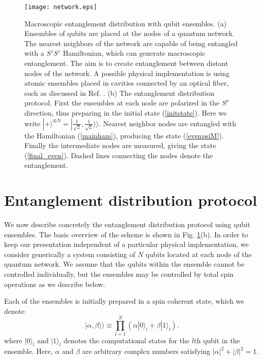 \documentclass[12pt]{iopart}
\begin{document}
\begin{figure}[t]
\centering
\texttt{[image: network.eps]}
\caption{\label{fig1}
Macroscopic entanglement distribution with qubit ensembles.  (a) Ensembles of qubits are placed at the nodes of a quantum network.  The nearest neighbors of the network are capable of being entangled with a $ S^z S^z $ Hamiltonian, which can generate macroscopic entanglement.  The aim is to create entanglement between distant nodes of the network.  A possible physical implementation is using atomic ensembles placed in cavities connected by an optical fiber, such as discussed in Ref. \cite{pyrkov2013entanglement}. 
(b) The entanglement distribution protocol.  First the ensembles at each node are polarized in the $ S^x $ direction, thus preparing in the initial state (\ref{initstate}).  Here we write $ | + \rangle^{\otimes N } = | \frac{1}{\sqrt{2}}, \frac{1}{\sqrt{2}} 
\rangle \rangle $. Nearest neighbor nodes are entangled with the Hamiltonian (\ref{mainham}), producing the state (\ref{evenpsiM}).  Finally the intermediate nodes are measured, giving the state (\ref{final_even}). Dashed lines connecting the nodes denote the entanglement.    }
\end{figure} 























\section{Entanglement distribution protocol}

We now describe concretely the entanglement distribution protocol using qubit ensembles. The basic overview of the scheme is shown in Fig. \ref{fig1}(b).  In order to keep our presentation independent of a particular physical implementation, we consider generically a system consisting of $ N $ qubits located at each node of the quantum network.  We assume that the qubits within the ensemble cannot be controlled individually, but the ensembles may be controlled by total spin operations as we describe below. 

Each of the ensembles is initially prepared in a spin coherent state, which we denote 
%
\begin{equation}
\label{ensemblequbit}
|\alpha,\beta\rangle\rangle\equiv \prod_{l=1}^N (\alpha |0\rangle_l +\beta |1 \rangle_l).  
\end{equation}
%
where $ |0\rangle_l $ and $ |1\rangle_l $ denotes the computational states for the $l$th qubit in the ensemble.  Here, $\alpha$ and $\beta$ are arbitrary complex numbers satisfying $|\alpha|^2+|\beta|^2=1$. 
\end{document}

